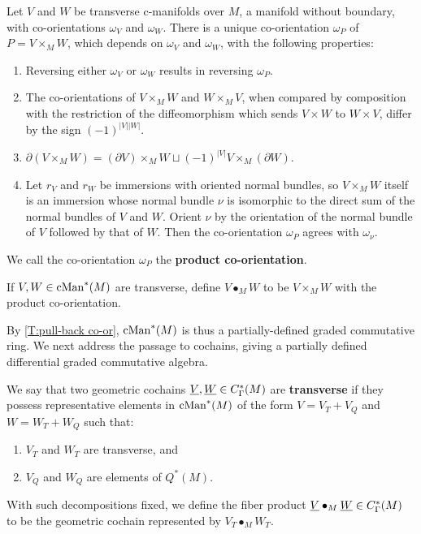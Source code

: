 \begin{theorem}\label{T:pull-back co-or}
	Let $V$ and $W$ be transverse c-manifolds over $M$, a manifold without boundary,
	with co-orientations $\omega_V$ and $\omega_W$.
	There is a unique co-orientation $\omega_P$ of $P = V \times_M W$, which depends on $\omega_V$ and $\omega_W$, with the following properties:
	\begin{enumerate}
		\item Reversing either $\omega_V$ or $\omega_W$ results in reversing $\omega_P$.
		\item The co-orientations of $V \times_M W$ and $W \times_M V$, when compared by composition with the restriction of the diffeomorphism which sends
		$V \times W$ to $W \times V$, differ by the sign $(-1)^{|V||W|}$.
		\item $\partial ( V \times_M W) = (\partial V) \times_M W \sqcup (-1)^{|V|} V \times_M (\partial W)$.
		\item Let $r_V$ and $r_W$ be immersions with oriented normal bundles, so $V \times_M W$ itself is an immersion whose
		normal bundle $\nu$ is isomorphic to the direct sum of the normal bundles of $V$ and $W$.
		Orient $\nu$ by the orientation of the normal bundle of $V$ followed by that of $W$.
		Then the co-orientation $\omega_P$ agrees with $\omega_{\nu}$.
	\end{enumerate}
\end{theorem}

We call the co-orientation $\omega_P$ the {\bf product co-orientation}.

\begin{definition}
	If $V, W \in \mathrm{cMan}^*(M)$ are transverse, define $V \bullet_M W$ to be $V \times_M W$ with the product co-orientation.
\end{definition}

By \cref{T:pull-back co-or}, $ \mathrm{cMan}^*(M)$ is thus a partially-defined graded commutative ring.
We next address the passage to cochains, giving a partially defined differential graded commutative algebra.

\begin{definition}\label{D:cochain trans}
	We say that two geometric cochains $\underline{V}, \underline{W} \in C^*_{\Gamma}(M)$ are \textbf{transverse} if they possess representative elements in $\mathrm{cMan}^*(M)$ of the form $V = V_T + V_Q$ and $W = W_T + W_Q$
	such that:
	\begin{enumerate}
		\item ${V_T}$ and ${W_T}$ are transverse, and
		\item ${V_Q}$ and ${W_Q}$ are elements of $Q^\ast(M)$.
	\end{enumerate}

	With such decompositions fixed, we define the fiber product $\underline{V} \bullet_M \underline{W} \in C^*_\Gamma(M)$ to be the geometric cochain represented by $V_T \bullet_M W_T$.
\end{definition}

